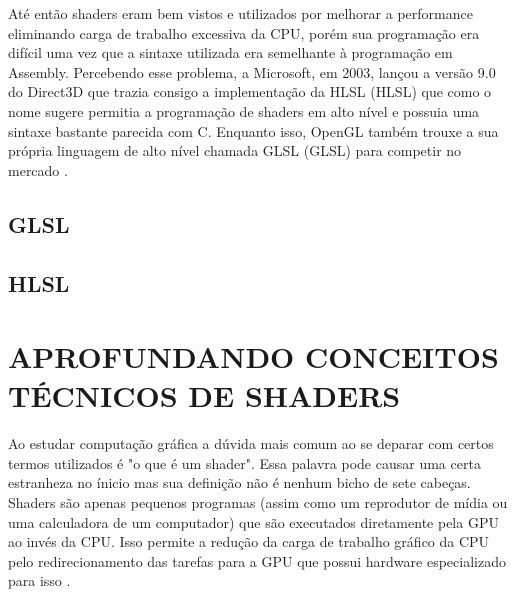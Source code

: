 Até então shaders eram bem vistos e utilizados por melhorar a performance eliminando carga de trabalho excessiva da \acrshort{CPU}, porém sua programação era difícil uma vez que a sintaxe utilizada era semelhante à programação em Assembly. Percebendo esse problema, a Microsoft, em 2003, lançou a versão 9.0 do Direct3D que trazia consigo a implementação da HLSL (\acrlong{HLSL}) que como o nome sugere permitia a programação de shaders em alto nível e possuia uma sintaxe bastante parecida com C. Enquanto isso, OpenGL também trouxe a sua própria linguagem de alto nível chamada GLSL (\acrlong{GLSL}) para competir no mercado \cite{openGLBook}. 

\subsection{GLSL}

\subsection{HLSL}

\section{APROFUNDANDO CONCEITOS TÉCNICOS DE SHADERS}
\label{sec:shaders-e-sua-definicao}

Ao estudar computação gráfica a dúvida mais comum ao se deparar com certos termos utilizados é "o que é um shader". Essa palavra pode causar uma certa estranheza no ínicio mas sua definição não é nenhum bicho de sete cabeças. Shaders são apenas pequenos programas (assim como um reprodutor de mídia ou uma calculadora de um computador) que são executados diretamente pela \acrshort{GPU} ao invés da \acrshort{CPU}. Isso permite a redução da carga de trabalho gráfico da \acrshort{CPU} pelo redirecionamento das tarefas para a \acrshort{GPU} que possui hardware especializado para isso \cite{openGLBook}.

	\begin{figure}[h!]
		\centering
	\end{figure}
	\nocite{figura5}

